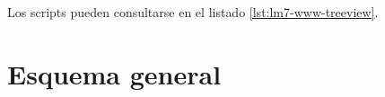 Los scripts pueden consultarse en el listado \ref{lst:lm7-www-treeview}.


\section{Esquema general}

%
%
%


